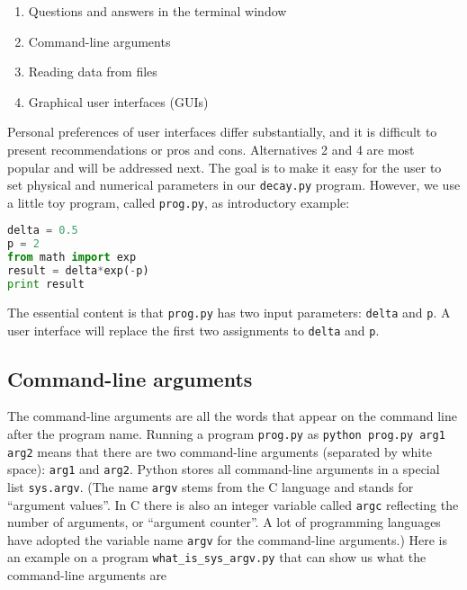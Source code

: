 \documentclass[graybox,sectrefs,envcountresetchap,open=right,final]{svmonodo}
\begin{document}
\begin{enumerate}
\item Questions and answers in the terminal window

\item Command-line arguments

\item Reading data from files

\item Graphical user interfaces (GUIs)
\end{enumerate}

\noindent
Personal preferences of user interfaces differ substantially, and it is
difficult to present recommendations or pros and cons.
Alternatives 2 and 4 are most popular and will be addressed next.
The goal is to make it easy for the user to
set physical and numerical parameters in
our \texttt{decay.py} program. However, we use  a little toy program, called
\texttt{prog.py}, as introductory
example:







\begin{lstlisting}[language=python,style=blue1bar_bluegreen]
delta = 0.5
p = 2
from math import exp
result = delta*exp(-p)
print result

\end{lstlisting}

The essential content is that \texttt{prog.py} has two input parameters: \texttt{delta}
and \texttt{p}. A user interface will replace the first two assignments to
\texttt{delta} and \texttt{p}.

\subsection{Command-line arguments}
\label{softeng1:basic:UI:cmlargs}

The command-line arguments are all the words that appear on the
command line after the program name. Running a program \texttt{prog.py}
as \texttt{python prog.py arg1 arg2} means that there are two command-line arguments
(separated by white space): \texttt{arg1} and \texttt{arg2}.
Python stores all command-line arguments in
a special list \texttt{sys.argv}. (The name \texttt{argv} stems from the C language and
stands for ``argument values''. In C there is also an integer variable
called \texttt{argc} reflecting the number of arguments, or ``argument counter''.
A lot of programming languages have adopted the variable name \texttt{argv} for
the command-line arguments.)
Here is an example on a
program \Verb!what_is_sys_argv.py! that can show us what the command-line arguments
are
\end{document}
